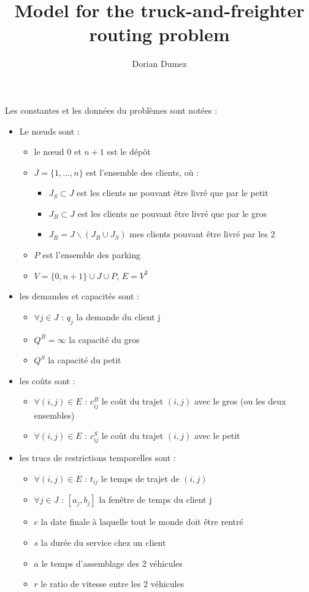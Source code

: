 \documentclass[12pt,a4paper,fleqn]{article}
\title{Model for the truck-and-freighter routing problem}
\author{Dorian Dumez}
\begin{document}
\maketitle

Les constantes et les données du problèmes sont notées :
\begin{itemize}
\item Le nœuds sont :
\begin{itemize}
\item le nœud 0 et $n+1$ est le dépôt
\item $J = \{1,...,n\}$ est l'ensemble des clients, où :
\begin{itemize}
\item $J_S \subset J$ est les clients ne pouvant être livré que par le petit
\item $J_B \subset J$ est les clients ne pouvant être livré que par le gros
\item $J_R = J \backslash (J_B \cup J_S)$ mes clients pouvant être livré par les 2
\end{itemize}
\item $P$ est l'ensemble des parking
\item $V = \{0, n+1\} \cup J \cup P$, $E = V^2$
\end{itemize}
\item les demandes et capacités sont :
\begin{itemize}
\item $\forall j \in J \text{ : } q_j$ la demande du client j
\item $Q^B = \infty$ la capacité du gros
\item $Q^S$ la capacité du petit
\end{itemize}
\item les coûts sont :
\begin{itemize}
\item $\forall (i,j) \in E \text{ : } c^B_{ij}$ le coût du trajet $(i,j)$ avec le gros (ou les deux ensembles)
\item $\forall (i,j) \in E \text{ : } c^S_{ij}$ le coût du trajet $(i,j)$ avec le petit
\end{itemize} 
\item les trucs de restrictions temporelles sont :
\begin{itemize}
\item $\forall (i,j) \in E \text{ : } t_{ij}$ le temps de trajet de $(i,j)$
\item $\forall j \in J \text{ : } [a_j,b_j]$ la fenêtre de temps du client j
\item $e$ la date finale à laquelle tout le monde doit être rentré
\item $s$ la durée du service chez un client
\item $a$ le temps d'assemblage des 2 véhicules
\item $r$ le ratio de vitesse entre les 2 véhicules
\end{itemize}
\end{itemize}
\end{document}
